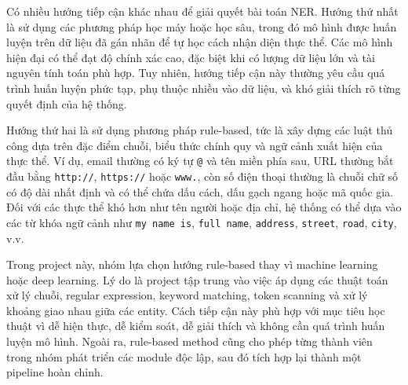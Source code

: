 Có nhiều hướng tiếp cận khác nhau để giải quyết bài toán NER. Hướng thứ nhất là sử dụng các phương pháp học máy hoặc học sâu, trong đó mô hình được huấn luyện trên dữ liệu đã gán nhãn để tự học cách nhận diện thực thể. Các mô hình hiện đại có thể đạt độ chính xác cao, đặc biệt khi có lượng dữ liệu lớn và tài nguyên tính toán phù hợp. Tuy nhiên, hướng tiếp cận này thường yêu cầu quá trình huấn luyện phức tạp, phụ thuộc nhiều vào dữ liệu, và khó giải thích rõ từng quyết định của hệ thống.

Hướng thứ hai là sử dụng phương pháp rule-based, tức là xây dựng các luật thủ công dựa trên đặc điểm chuỗi, biểu thức chính quy và ngữ cảnh xuất hiện của thực thể. Ví dụ, email thường có ký tự \texttt{@} và tên miền phía sau, URL thường bắt đầu bằng \texttt{http://}, \texttt{https://} hoặc \texttt{www.}, còn số điện thoại thường là chuỗi chữ số có độ dài nhất định và có thể chứa dấu cách, dấu gạch ngang hoặc mã quốc gia. Đối với các thực thể khó hơn như tên người hoặc địa chỉ, hệ thống có thể dựa vào các từ khóa ngữ cảnh như \texttt{my name is}, \texttt{full name}, \texttt{address}, \texttt{street}, \texttt{road}, \texttt{city}, v.v.

Trong project này, nhóm lựa chọn hướng rule-based thay vì machine learning hoặc deep learning. Lý do là project tập trung vào việc áp dụng các thuật toán xử lý chuỗi, regular expression, keyword matching, token scanning và xử lý khoảng giao nhau giữa các entity. Cách tiếp cận này phù hợp với mục tiêu học thuật vì dễ hiện thực, dễ kiểm soát, dễ giải thích và không cần quá trình huấn luyện mô hình. Ngoài ra, rule-based method cũng cho phép từng thành viên trong nhóm phát triển các module độc lập, sau đó tích hợp lại thành một pipeline hoàn chỉnh.

